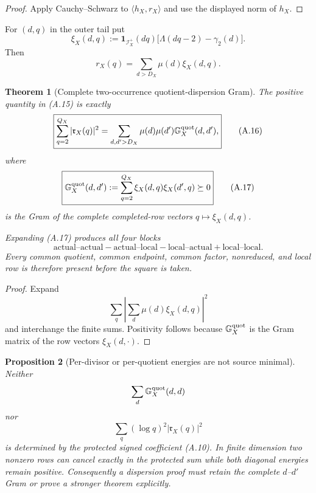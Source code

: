 \documentclass[11pt]{article}
\newtheorem{theorem}{Theorem}[section]
\newtheorem{proposition}[theorem]{Proposition}
\theoremstyle{definition}
\theoremstyle{remark}
\newcommand{\one}{\mathbf 1}
\begin{document}
\begin{proof}
Apply Cauchy--Schwarz to
$\langle h_X,r_X\rangle$ and use the displayed norm of $h_X$.
\end{proof}

For $(d,q)$ in the outer tail put
\[
 \xi_X(d,q)
 :=\one_{\mathscr I_X^+}(dq)
   \bigl[\Lambda(dq-2)-\gamma_2(d)\bigr].
\]
Then
\[
 r_X(q)=\sum_{d>D_X}\mu(d)\xi_X(d,q).
\]

\begin{theorem}[Complete two-occurrence quotient-dispersion Gram]
\label{thm:affouter-complete-Gram}
The positive quantity in \textup{(A.15)} is exactly
\begin{equation}
 \label{eq:affouter-complete-Gram}
 \boxed{
 \sum_{q=2}^{Q_X}|\mathfrak r_X(q)|^2
 =\sum_{d,d'>D_X}\mu(d)\mu(d')
   \mathbb G_X^{\rm quot}(d,d'),}
 \tag{A.16}
\end{equation}
where
\begin{equation}
 \label{eq:affouter-Gram-block}
 \boxed{
 \mathbb G_X^{\rm quot}(d,d')
 :=\sum_{q=2}^{Q_X}
   \xi_X(d,q)\xi_X(d',q)
 \succeq0}
 \tag{A.17}
\end{equation}
is the Gram of the complete completed-row vectors
$q\mapsto\xi_X(d,q)$.

Expanding \textup{(A.17)} produces all four blocks
\[
 \boxed{
 \text{actual--actual}
 -\text{actual--local}
 -\text{local--actual}
 +\text{local--local}.}
\]
Every common quotient, common endpoint, common factor, nonreduced, and local
row is therefore present before the square is taken.
\end{theorem}

\begin{proof}
Expand
\[
 \sum_q
 \left|
  \sum_d\mu(d)\xi_X(d,q)
 \right|^2
\]
and interchange the finite sums.  Positivity follows because
$\mathbb G_X^{\rm quot}$ is the Gram matrix of the row vectors
$\xi_X(d,\cdot)$.
\end{proof}

\begin{proposition}[Per-divisor or per-quotient energies are not source minimal]
\label{cth:affouter-diagonal-no-go}
Neither
\[
 \sum_d\mathbb G_X^{\rm quot}(d,d)
\]
nor
\[
 \sum_q(\log q)^2|\mathfrak r_X(q)|^2
\]
is determined by the protected signed coefficient \textup{(A.10)}.  In finite
dimension two nonzero rows can cancel exactly in the protected sum while
both diagonal energies remain positive.  Consequently a dispersion proof
must retain the complete $d$--$d'$ Gram or prove a stronger theorem explicitly.
\end{proposition}
\end{document}
